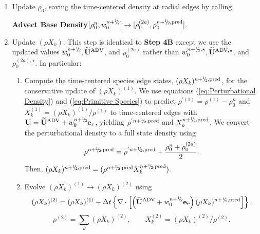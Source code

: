 \begin{description}
\begin{enumerate}
\renewcommand{\theenumi}{{\bf \Alph{enumi}}}

\item Update $\rho_0$, saving the time-centered density at radial edges by calling

{\bf Advect Base Density}$[\rho_0^{n},w_0^{\nph}] \rightarrow [\rho_0^{(2a)}, \rho_0^{\nph,\pred}]$.

\item Update $(\rho X_k)$.  This step is identical to {\bf Step 4B} except we use
  the updated values $w_0^{\nph}, \uadvtwo$, and $\rho_0^{(2a)}$ rather than 
  $w_0^{\nph,\star}, \uadvone$, and $\rho_0^{(2a),\star}$.  In particular:

\begin{enumerate}
\renewcommand{\labelenumii}{{\bf \roman{enumii}}.}

\item Compute the time-centered species edge states, $(\rho X_k)^{\nph,\pred}$,
  for the conservative update of $(\rho X_k)^{(1)}$.  We use equations 
  (\ref{eq:Perturbational Density}) and (\ref{eq:Primitive Species}) to 
  predict $\rho^{'(1)} = \rho^{(1)} - \rho_0^n$ and 
  $X_k^{(1)} = (\rho  X_k)^{(1)} / \rho^{(1)}$ to time-centered edges
  with $\Ub = \uadvtwo+w_0^{\nph} \eb_r$,
  yielding $\rho^{'\nph,\pred}$ and $X_k^{\nph,\pred}$.  
  We convert the perturbational density to a full state density using
\begin{equation}
\rho^{\nph,\pred} = \rho^{'\nph,\pred} + \frac{\rho_0^n + \rho_0^{(2a)}}{2}.
\end{equation}
  Then, $(\rho X_k)^{\nph,\pred} = (\rho^{\nph,\pred}X_k^{\nph,\pred})$.

\item Evolve $(\rho X_k)^{(1)} \rightarrow (\rho X_k)^{(2)}$ using
\begin{equation}
(\rho X_k)^{(2)} = (\rho X_k)^{(1)} 
- \dt \left\{ \nabla \cdot \left[\left(\uadvtwo+w_0^{\nph} \eb_r\right)  
(\rho X_k)^{\nph,\pred} \right] \right\},
\end{equation}
\begin{equation}
\rho^{(2)} = \sum_k (\rho X_k)^{(2)},
\qquad
X_k^{(2)} = (\rho X_k)^{(2)} / \rho^{(2)}.
\end{equation}

\end{enumerate}


\end{enumerate}
\end{description}
